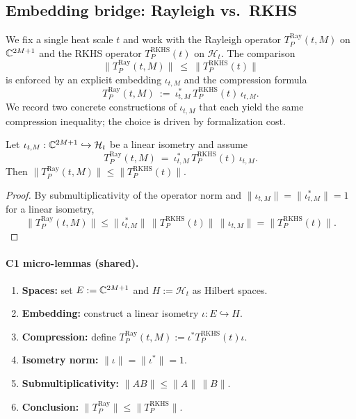 \subsection{Embedding bridge: Rayleigh vs.\ RKHS}\label{subsec:a3-embedding-bridge}
We fix a single heat scale $t$ and work with the Rayleigh operator
$T_P^{\mathrm{Ray}}(t,M)$ on $\mathbb C^{2M+1}$ and the RKHS operator
$T_P^{\mathrm{RKHS}}(t)$ on $\mathcal H_t$.  The comparison
\[
  \bigl\|T_P^{\mathrm{Ray}}(t,M)\bigr\| \ \le\ \bigl\|T_P^{\mathrm{RKHS}}(t)\bigr\|
\]
is enforced by an explicit embedding $\iota_{t,M}$ and the compression formula
\[
  T_P^{\mathrm{Ray}}(t,M)\ :=\ \iota_{t,M}^\ast\,T_P^{\mathrm{RKHS}}(t)\,\iota_{t,M}.
\]
We record two concrete constructions of $\iota_{t,M}$ that each yield the same
compression inequality; the choice is driven by formalization cost.

\begin{lemma}\label{lem:a3-embedding-compression}
Let $\iota_{t,M}:\mathbb C^{2M+1}\hookrightarrow \mathcal H_t$ be a linear isometry and assume
\[
T_P^{\mathrm{Ray}}(t,M)\ =\ \iota_{t,M}^\ast\,T_P^{\mathrm{RKHS}}(t)\,\iota_{t,M}.
\]
Then $\|T_P^{\mathrm{Ray}}(t,M)\|\le \|T_P^{\mathrm{RKHS}}(t)\|$.
\end{lemma}
\begin{proof}
By submultiplicativity of the operator norm and $\|\iota_{t,M}\|=\|\iota_{t,M}^\ast\|=1$ for a linear isometry,
\[
\|T_P^{\mathrm{Ray}}(t,M)\|
\le \|\iota_{t,M}^\ast\|\,\|T_P^{\mathrm{RKHS}}(t)\|\,\|\iota_{t,M}\|
 = \|T_P^{\mathrm{RKHS}}(t)\|.
\]
\end{proof}

\paragraph{C1 micro-lemmas (shared).}
\begin{enumerate}
  \item \textbf{Spaces:} set $E:=\mathbb C^{2M+1}$ and $H:=\mathcal H_t$ as Hilbert spaces.
  \item \textbf{Embedding:} construct a linear isometry $\iota:E\hookrightarrow H$.
  \item \textbf{Compression:} define $T_P^{\mathrm{Ray}}(t,M):=\iota^\ast T_P^{\mathrm{RKHS}}(t)\iota$.
  \item \textbf{Isometry norm:} $\|\iota\|=\|\iota^\ast\|=1$.
  \item \textbf{Submultiplicativity:} $\|AB\|\le\|A\|\,\|B\|$.
  \item \textbf{Conclusion:} $\|T_P^{\mathrm{Ray}}\|\le\|T_P^{\mathrm{RKHS}}\|$.
\end{enumerate}

